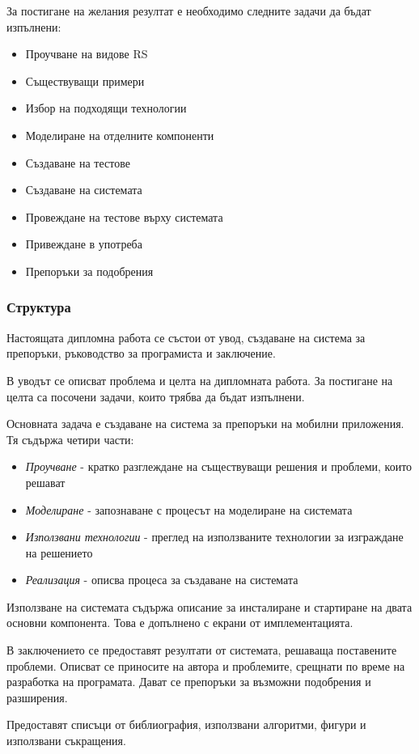 		За постигане на желания резултат е необходимо следните задачи да бъдат изпълнени:	
	
		\begin{itemize}
			\item Проучване на видове \ac{RS}
			\item Съществуващи примери
			\item Избор на подходящи технологии
			\item Моделиране на отделните компоненти
			\item Създаване на тестове
			\item Създаване на системата
			\item Провеждане на тестове върху системата
			\item Привеждане в употреба
			\item Препоръки за подобрения
		\end{itemize}
		
	\subsubsection{Структура}
	
	Настоящата дипломна работа се състои от увод, създаване на система за препоръки, 
	ръководство за програмиста и заключение.
	
	В уводът се описват проблема и целта на дипломната работа. За постигане на целта са посочени
	задачи, които трябва да бъдат изпълнени.
	
	Основната задача е създаване на система за препоръки на мобилни приложения. Тя съдържа четири части:	
	\begin{itemize}
		\item \emph{Проучване} - кратко разглеждане на съществуващи решения и проблеми, които решават
		\item \emph{Моделиране} - запознаване с процесът на моделиране на системата
		\item \emph{Използвани технологии} - преглед на използваните технологии за изграждане на решението
		\item \emph{Реализация} - описва процеса за създаване на системата
	\end{itemize}
	
	Използване на системата съдържа описание за инсталиране и стартиране на двата основни компонента.
	Това е допълнено с екрани от имплементацията.
	
	В заключението се предоставят резултати от системата, решаваща поставените проблеми. Описват се приносите на автора и проблемите, срещнати по време на разработка на програмата. Дават се препоръки за възможни подобрения и разширения.

	Предоставят списъци от библиография, използвани алгоритми, фигури и използвани съкращения.